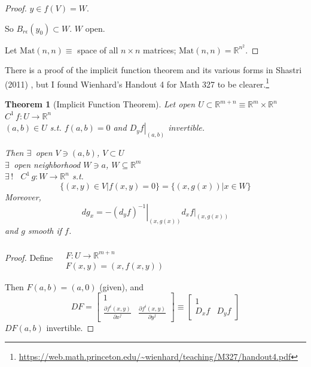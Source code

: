 \documentclass[10pt]{amsart}
\newtheorem{theorem}{Theorem}
\begin{document}
\begin{multicols*}{2}
\begin{proof}
$y\in f(V) = W$.  

So $B_{r\epsilon}(y_0) \subset W$.  $W$ open.  

Let $\text{Mat}(n,n) \equiv $ space of all $n\times n$ matrices; $\text{Mat}(n,n)  = \mathbb{R}^{n^2}$.  


\end{proof}

There is a proof of the implicit function theorem and its various forms in Shastri (2011) \cite{AShastri2011}, but I found Wienhard's Handout 4 for Math 327 to be clearer.\footnote{\url{https://web.math.princeton.edu/~wienhard/teaching/M327/handout4.pdf}}

\begin{theorem}[Implicit Function Theorem]
Let open $U \subset \mathbb{R}^{m+n} \equiv \mathbb{R}^m \times \mathbb{R}^n$  \\
\phantom{Let} $C^1 \, f:U \to \mathbb{R}^n $ \\
\phantom{Let} $(a,b) \in U$ s.t. $f(a,b) = 0$ and $\left. D_y f\right|_{(a,b)}$ invertible.  

Then $\exists \, $ open $V \ni (a,b)$, $V \subset U$ \\
\phantom{Then} $\exists \, $ open neighborhood $W \ni a$, $W \subseteq \mathbb{R}^m$ \\
\phantom{Then} $\exists \, !$ \, $C^1 \, g:W \to \mathbb{R}^n$ s.t.
\[
\lbrace (x,y) \in V | f(x,y) =0 \rbrace = \lbrace (x,g(x)) | x \in W \rbrace
\]
Moreover,
\[
dg_x = - \left. (d_yf)^{-1} \right|_{(x,g(x))} \left. d_x f\right|_{(x,g(x))}
\]
and $g$ smooth if $f$.  
\end{theorem}

\begin{proof}
  Define $\begin{aligned} & \quad \\
    & F: U \to \mathbb{R}^{m+n}   \\
    & F(x,y) = (x,f(x,y)) \end{aligned}$

Then $F(a,b) = (a,0)$ (given), and 
\[
DF = \left[ \begin{matrix} 1 & \\ 
    \frac{ \partial f^i(x,y)}{ \partial x^j} & \frac{ \partial f^i(x,y) }{ \partial y^j } \end{matrix} \right] \equiv \left[ \begin{matrix} 1 & \\
    D_xf & D_yf \end{matrix} \right]
\]
$DF(a,b)$ invertible.  


\end{proof}
\end{multicols*}
\end{document}
